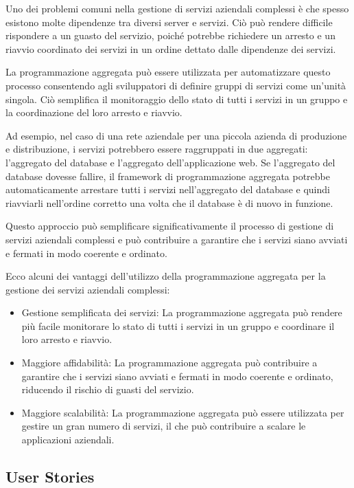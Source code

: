 Uno dei problemi comuni nella gestione di servizi aziendali complessi è che spesso esistono molte dipendenze tra diversi server e servizi. Ciò può rendere difficile rispondere a un guasto del servizio, poiché potrebbe richiedere un arresto e un riavvio coordinato dei servizi in un ordine dettato dalle dipendenze dei servizi.

La programmazione aggregata può essere utilizzata per automatizzare questo processo consentendo agli sviluppatori di definire gruppi di servizi come un'unità singola. Ciò semplifica il monitoraggio dello stato di tutti i servizi in un gruppo e la coordinazione del loro arresto e riavvio.

Ad esempio, nel caso di una rete aziendale per una piccola azienda di produzione e distribuzione, i servizi potrebbero essere raggruppati in due aggregati: l'aggregato del database e l'aggregato dell'applicazione web. Se l'aggregato del database dovesse fallire, il framework di programmazione aggregata potrebbe automaticamente arrestare tutti i servizi nell'aggregato del database e quindi riavviarli nell'ordine corretto una volta che il database è di nuovo in funzione.

Questo approccio può semplificare significativamente il processo di gestione di servizi aziendali complessi e può contribuire a garantire che i servizi siano avviati e fermati in modo coerente e ordinato.

Ecco alcuni dei vantaggi dell'utilizzo della programmazione aggregata per la gestione dei servizi aziendali complessi:

\begin{itemize}
    \item Gestione semplificata dei servizi: La programmazione aggregata può rendere più facile monitorare lo stato di tutti i servizi in un gruppo e coordinare il loro arresto e riavvio.
    \item Maggiore affidabilità: La programmazione aggregata può contribuire a garantire che i servizi siano avviati e fermati in modo coerente e ordinato, riducendo il rischio di guasti del servizio.
    \item Maggiore scalabilità: La programmazione aggregata può essere utilizzata per gestire un gran numero di servizi, il che può contribuire a scalare le applicazioni aziendali.
\end{itemize}

\subsection{User Stories}


